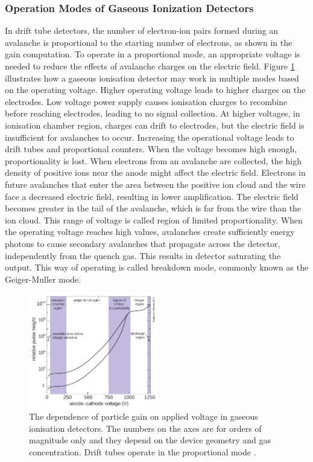 \subsubsection{Operation Modes of Gaseous Ionization Detectors}
In drift tube detectors, the number of electron-ion pairs formed during an avalanche is 
proportional to the starting number of electrons, as shown in the gain computation. To 
operate in a proportional mode, an appropriate voltage is needed to reduce the effects 
of avalanche charges on the electric field. Figure \ref{fig:gaseous} illustrates how a 
gaseous ionisation detector may work in multiple modes based on the operating voltage. Higher operating 
voltage leads to higher charges on the electrodes. Low voltage power supply causes ionisation charges to recombine 
before reaching electrodes, leading to no signal collection. At higher voltages, in ionisation chamber 
region, charges can drift to electrodes, but the electric field is insufficient for avalanches to occur. 
Increasing the operational voltage leads to drift tubes and proportional counters. When the voltage 
becomes high enough, proportionality is lost. When electrons from an avalanche are collected, 
the high density of positive ions near the anode might affect the electric field. 
Electrons in future avalanches that enter the area between the positive ion cloud and the wire face a 
decreased electric field, resulting in lower amplification. The electric field becomes greater in the 
tail of the avalanche, which is far from the wire than the ion cloud. This range of voltage is called region of 
limited proportionality. When the operating voltage reaches high values, 
avalanches create sufficiently energy photons to cause secondary avalanches 
that propagate across the detector, independently from the quench gas. 
This results in detector saturating the output. This way of operating is 
called breakdown mode, commonly known as the Geiger-Muller mode.
\begin{figure}[!h]
    \centering
    \includegraphics[width =0.5\textwidth]{figures/png/Screenshot_20240330_203416.png}
    \caption[The dependence of particle gain on applied voltage in gaseous ionisation detectors.]{The dependence of particle gain on applied voltage in gaseous ionisation detectors. 
    The numbers on the axes are for orders of magnitude only and they depend on the device geometry and gas concentration. 
    Drift tubes operate in the proportional mode \cite{kola}.}
    \label{fig:gaseous}
    \end{figure}
